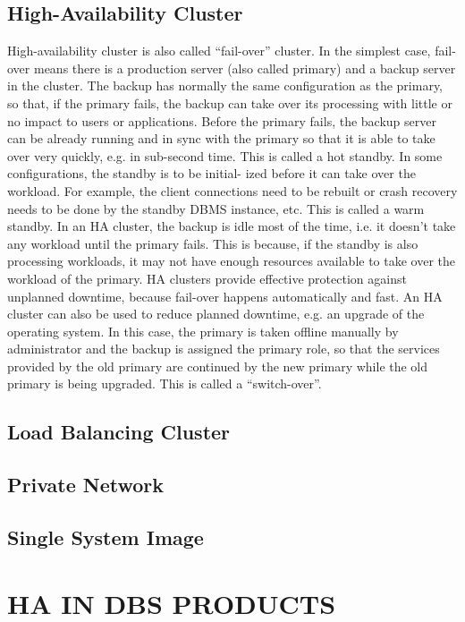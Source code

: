 \documentclass[english]{tktltiki2}
\theoremstyle{definition}
\theoremstyle{remark}
\begin{document}
\subsection{High-Availability Cluster}
High-availability cluster is also called “fail-over” cluster. In the simplest case, fail-over means there is a production server (also called primary) and a backup server in the
cluster. The backup has normally the same configuration as the primary, so that, if the
primary fails, the backup can take over its processing with little or no impact to users or
applications. Before the primary fails, the backup server can be already running and in
sync with the primary so that it is able to take over very quickly, e.g. in sub-second
time. This is called a hot standby. In some configurations, the standby is to be initial-
ized before it can take over the workload. For example, the client connections need to
be rebuilt or crash recovery needs to be done by the standby DBMS instance, etc. This
is called a warm standby. In an HA cluster, the backup is idle most of the time, i.e. it
doesn’t take any workload until the primary fails. This is because, if the standby is also
processing workloads, it may not have enough resources available to take over the
workload of the primary.
HA clusters provide effective protection against unplanned downtime, because
fail-over happens automatically and fast. An HA cluster can also be used to reduce
planned downtime, e.g. an upgrade of the operating system. In this case, the primary is
taken offline manually by administrator and the backup is assigned the primary role, so
that the services provided by the old primary are continued by the new primary while
the old primary is being upgraded. This is called a “switch-over”.

\subsection{Load Balancing Cluster}

\subsection{Private Network}

\subsection{Single System Image}

\section{HA IN DBS PRODUCTS}
\end{document}
